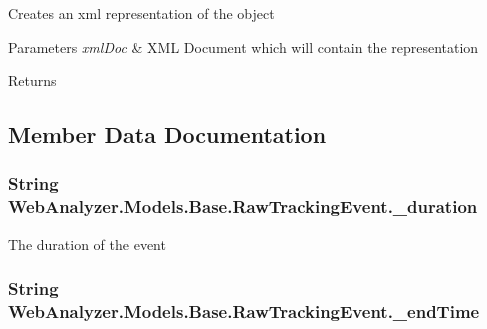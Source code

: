 Creates an xml representation of the object 


\begin{DoxyParams}{Parameters}
{\em xml\+Doc} & X\+M\+L Document which will contain the representation\\
\hline
\end{DoxyParams}
\begin{DoxyReturn}{Returns}

\end{DoxyReturn}


\subsection{Member Data Documentation}
\hypertarget{class_web_analyzer_1_1_models_1_1_base_1_1_raw_tracking_event_afbef9b63be3062a1b78772f91c6d0afb}{}
\subsubsection[{\+\_\+duration}]{\setlength{\rightskip}{0pt plus 5cm}String Web\+Analyzer.\+Models.\+Base.\+Raw\+Tracking\+Event.\+\_\+duration\hspace{0.3cm}{\ttfamily [private]}}\label{class_web_analyzer_1_1_models_1_1_base_1_1_raw_tracking_event_afbef9b63be3062a1b78772f91c6d0afb}


The duration of the event 

\hypertarget{class_web_analyzer_1_1_models_1_1_base_1_1_raw_tracking_event_ad38ed6682d18d1ff4aebc5185a145739}{}
\subsubsection[{\+\_\+end\+Time}]{\setlength{\rightskip}{0pt plus 5cm}String Web\+Analyzer.\+Models.\+Base.\+Raw\+Tracking\+Event.\+\_\+end\+Time\hspace{0.3cm}{\ttfamily [private]}}\label{class_web_analyzer_1_1_models_1_1_base_1_1_raw_tracking_event_ad38ed6682d18d1ff4aebc5185a145739}


